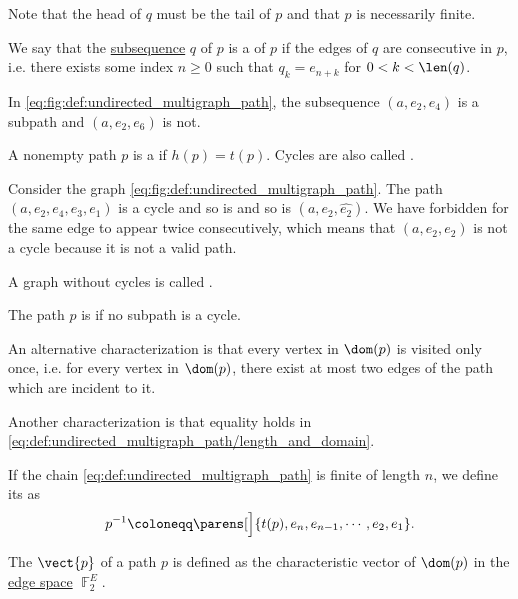 \begin{definition}
\begin{thmenum}
    Note that the head of \( q \) must be the tail of \( p \) and that \( p \) is necessarily finite.

     We say that the \hyperref[def:subsequence]{subsequence} \( q \) of \( p \) is a  of \( p \) if the edges of \( q \) are consecutive in \( p \), i.e. there exists some index \( n \geq 0 \) such that \( q_k = e_{n + k} \) for \( 0 < k < \len(q) \).

    In \eqref{eq:fig:def:undirected_multigraph_path}, the subsequence \( (a, e_2, e_4) \) is a subpath and \( (a, e_2, e_6) \) is not.

     A nonempty path \( p \) is a  if \( h(p) = t(p) \). Cycles are also called .

    Consider the graph \eqref{eq:fig:def:undirected_multigraph_path}. The path \( (a, e_2, e_4, e_3, e_1) \) is a cycle and so is and so is \( (a, e_2, \widehat{e_2}) \). We have forbidden for the same edge to appear twice consecutively, which means that \( (a, e_2, e_2) \) is not a cycle because it is not a valid path.

    A graph without cycles is called .

     The path \( p \) is  if no subpath is a cycle.

    An alternative characterization is that every vertex in \( \dom(p) \) is visited only once, i.e. for every vertex in \( \dom(p) \), there exist at most two edges of the path which are incident to it.

    Another characterization is that equality holds in \eqref{eq:def:undirected_multigraph_path/length_and_domain}.

     If the chain \eqref{eq:def:undirected_multigraph_path} is finite of length \( n \), we define its  as
    \begin{equation*}
      p^{-1} \coloneqq \parens[\Big]{ t(p), e_n, e_{n-1}, \cdots, e_2, e_1 }.
    \end{equation*}

     The  \( \vect{p} \) of a path \( p \) is defined as the characteristic vector of \( \dom(p) \) in the \hyperref[def:hypergraph_vector_spaces/edge]{edge space} \( \BbbF_2^E \).
  \end{thmenum}
\end{definition}

